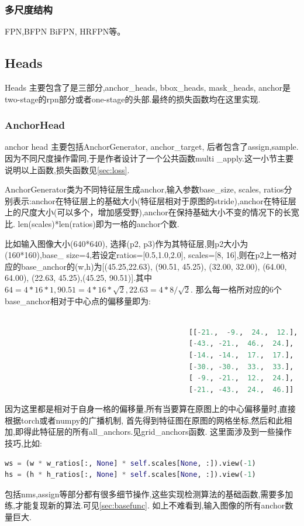 \documentclass[UTF8]{ctexart}
\begin{document}
\subsubsection{多尺度结构}
FPN,BFPN BiFPN, HRFPN等。

\subsection{Heads}
Heads 主要包含了是三部分,anchor\_heads, bbox\_heads, mask\_heads,
anchor是two-stage的rpn部分或者one-stage的头部.最终的损失函数均在这里实现.

\subsubsection{AnchorHead}
\label{sub:anchorhead}
anchor head 主要包括AnchorGenerator, anchor\_target, 后者包含了assign,sample.因为不同尺度操作雷同,于是作者设计了一个公共函数multi
\_apply.这一小节主要说明以上函数,损失函数见\ref{sec:loss}.

AnchorGenerator类为不同特征层生成anchor,输入参数base\_size, scales, ratios分别表示:anchor在特征层上的基础大小(特征层相对于原图的stride),anchor在特征层上的尺度大小(可以多个，增加感受野),anchor在保持基础大小不变的情况下的长宽比.
len(scales)*len(ratios)即为一格的anchor个数.

比如输入图像大小(640*640), 选择(p2, p3)作为其特征层,则p2大小为(160*160),base\_ size=4,若设定ratios=[0.5,1.0,2.0], scales=[8, 16],则在p2上一格对应的base\_anchor的(w,h)为[(45.25,22.63),  (90.51, 45.25),
 (32.00, 32.00),  (64.00, 64.00), (22.63, 45.25),(45.25, 90.51)].其中$64=4*16*1,90.51=4*16*\sqrt{2}, 22.63=4*8/\sqrt{2}.$
 那么每一格所对应的6个base\_anchor相对于中心点的偏移量即为:
\lstset{style=mystyle}
\begin{lstlisting}[language=Python]
	
											[[-21.,  -9.,  24.,  12.],
											[-43., -21.,  46.,  24.],
											[-14., -14.,  17.,  17.],
											[-30., -30.,  33.,  33.],
											[ -9., -21.,  12.,  24.],
											[-21., -43.,  24.,  46.]]

\end{lstlisting}

因为这里都是相对于自身一格的偏移量,所有当要算在原图上的中心偏移量时,直接根据torch或者numpy的广播机制,
首先得到特征图在原图的网格坐标,然后和此相加,即得此特征层的所有all\_anchors.见grid\_anchors函数.
这里面涉及到一些操作技巧,比如:
\lstset{style=mystyle}
\begin{lstlisting}[language=Python]
ws = (w * w_ratios[:, None] * self.scales[None, :]).view(-1)
hs = (h * h_ratios[:, None] * self.scales[None, :]).view(-1)
\end{lstlisting}
包括nms,assign等部分都有很多细节操作,这些实现检测算法的基础函数,需要多加练,才能复现新的算法.可见\ref{sec:basefunc}.
如上不难看到,输入图像的所有anchor数量巨大.
\end{document}

